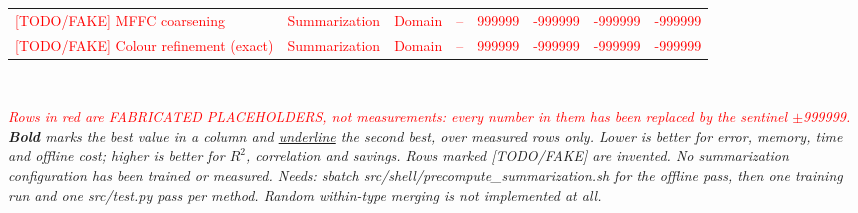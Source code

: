 \begin{table}[htbp]
{\begin{tabular}{lllrrrrr}
\textcolor{red}{{[TODO/FAKE] MFFC coarsening}} & \textcolor{red}{Summarization} & \textcolor{red}{Domain} & \textcolor{red}{--} & \textcolor{red}{999999} & \textcolor{red}{-999999} & \textcolor{red}{-999999} & \textcolor{red}{-999999} \\
\textcolor{red}{{[TODO/FAKE] Colour refinement (exact)}} & \textcolor{red}{Summarization} & \textcolor{red}{Domain} & \textcolor{red}{--} & \textcolor{red}{999999} & \textcolor{red}{-999999} & \textcolor{red}{-999999} & \textcolor{red}{-999999} \\
\bottomrule
\end{tabular}
}
\\[4pt]\begin{minipage}{\linewidth}\footnotesize\emph{\textcolor{red}{Rows in red are FABRICATED PLACEHOLDERS, not measurements: every number in them has been replaced by the sentinel $\pm$999999.} \textbf{Bold} marks the best value in a column and \underline{underline} the second best, over measured rows only. Lower is better for error, memory, time and offline cost; higher is better for $R^2$, correlation and savings. Rows marked [TODO/FAKE] are invented. No summarization configuration has been trained or measured. Needs: sbatch src/shell/precompute\_summarization.sh for the offline pass, then one training run and one src/test.py pass per method. Random within-type merging is not implemented at all.}\end{minipage}
\end{table}
